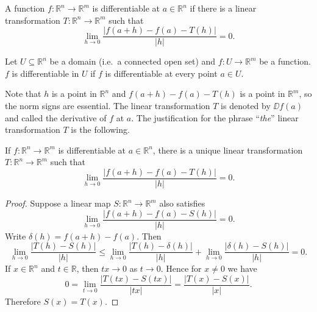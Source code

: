 \documentclass[11pt]{article}
\begin{document}
\begin{defn}
  A function $f : \mathbb{R}^n \rightarrow \mathbb{R}^m$ is \textsf{
  differentiable} at $a \in \mathbb{R}^n$ if there is a linear
  transformation $T: \mathbb{R}^n \rightarrow \mathbb{R}^m$ such that
  \begin{equation}
    \label{eq:dmn}
    \lim_{h \rightarrow 0} \frac{ |f(a+h) - f(a) - T(h)| }{|h|}
    = 0.
  \end{equation}

  Let $U \subseteq \mathbb{R}^n$ be a \textsf{domain} (i.e.~a
  connected open set) and $f : U \rightarrow \mathbb{R}^m$ be a
  function.  $f$ is \textsf{differentiable} in $U$ if $f$ is
  differentiable at every point $a \in U$.
\end{defn}

Note that $h$ is a point in $\mathbb{R}^n$ and $f(a+h) - f(a) - T(h)$
is a point in $\mathbb{R}^m$, so the norm signs are essential.  The linear
transformation $T$ is denoted by $\DD f(a)$ and called the
\textsf{derivative} of $f$ at $a$.  The justification for the
phrase ``{\em the\/}'' linear transformation $T$ is the following.

\begin{thm}
  If $f: \mathbb{R}^n \rightarrow \mathbb{R}^m$ is differentiable at $a \in \mathbb{R}^n$, there is a unique linear transformation $T : \mathbb{R}^n \rightarrow \mathbb{R}^m$ such that
  \begin{equation*}
    \lim_{h \rightarrow 0} \frac{ |f(a+h) - f(a) - T(h)| }{|h|}
    = 0.
  \end{equation*}
\end{thm}

\begin{proof}
Suppose a linear map $S : \mathbb{R}^n \rightarrow \mathbb{R}^m$ also satisfies
\begin{equation*}
  \lim_{h \rightarrow 0} \frac{ |f(a+h) - f(a) - S(h)| }{|h|} = 0.
\end{equation*}
Write $\delta(h) = f(a + h) - f(a)$.  Then
\begin{equation*}
  \lim_{h \rightarrow 0} \frac{|T(h) - S(h)|}{|h|} \leqslant 
  \lim_{h \rightarrow 0} \frac{|T(h) - \delta(h)|}{|h|} + 
  \lim_{h \rightarrow 0} \frac{|\delta(h) - S(h)|}{|h|} = 0.
\end{equation*}
If $x \in \mathbb{R}^n$ and $t \in \mathbb{R}$, then $tx \rightarrow 0$ as $t
\rightarrow 0$.  Hence for $x \neq 0$ we have
\begin{equation*}
  0 = \lim_{t \rightarrow 0} \frac{ | T(tx) - S(tx) | }{|tx|} 
  = \frac{ | T(x) - S(x) | }{ |x| }.
\end{equation*}
Therefore $S(x) = T(x)$.
\end{proof}
\end{document}
